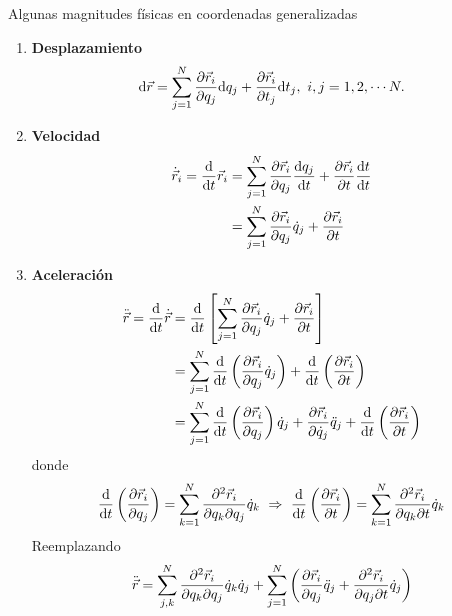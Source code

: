 \documentclass[../main]{subfiles}
\begin{document}
Algunas magnitudes físicas en coordenadas generalizadas
\begin{enumerate}
    \item \textbf{Desplazamiento}
    \begin{equation}
        \mathrm{d}\vec{r}=\sum_{j=1}^N \pdv{\vec{r}_i}{q_j}\mathrm{d}q_j+\pdv{\vec{r}_i}{t_j}\mathrm{d}t_j,\ i,j=1,2, \cdots N.
    \end{equation}
    \item \textbf{Velocidad}
    \begin{equation}
        \begin{split}
            \dot{\vec{r}}_i=\dv{}{t}\vec{r}_i&=\sum_{j=1}^N \pdv{\vec{r}_i}{q_j} \dv{q_j}{t}+\pdv{\vec{r}_i}{t}\dv{t}{t}\\
            &=\sum_{j=1}^N \pdv{\vec{r}_i}{q_j}\dot{q}_j+\pdv{\vec{r}_i}{t}
        \end{split}
    \end{equation}
    \item \textbf{Aceleración}
    \begin{equation}
        \begin{split}
            \ddot{\vec{r}}=\dv{}{t}\dot{\vec{r}}&=\dv{}{t}\left[\sum_{j=1}^N \pdv{\vec{r}_i}{q_j}\dot{q}_j+\pdv{\vec{r}_i}{t}\right]\\
            &=\sum_{j=1}^N \dv{}{t}\left(\pdv{\vec{r}_i}{q_j}\dot{q}_j\right)+\dv{}{t}\left(\pdv{\vec{r}_i}{t}\right)\\
            &=\sum_{j=1}^N \dv{}{t}\left(\pdv{\vec{r}_i}{q_j}\right)\dot{q}_j+\pdv{\vec{r}_i}{\dot{q}_j}\ddot{q}_j+\dv{}{t}\left(\pdv{\vec{r}_i}{t}\right)
        \end{split}
    \end{equation}
    donde
    \begin{equation}
        \dv{}{t}\left(\pdv{\vec{r}_i}{q_j}\right)=\sum_{k=1}^N \pdv{^2 \vec{r}_i}{q_k \partial q_j}\dot{q}_k \ \Rightarrow \ \dv{}{t}\left(\pdv{\vec{r}_i}{t}\right)=\sum_{k=1}^N \pdv{^2 \vec{r}_i}{q_k \partial t}\dot{q}_k
    \end{equation}
    Reemplazando
    \begin{equation}
        \ddot{\vec{r}}=\sum_{j,k}^N \pdv{^2 \vec{r}_i}{q_k \partial q_j} \dot{q}_k \dot{q}_j+\sum_{j=1}^N \left(\pdv{\vec{r}_i}{q_j}\ddot{q}_j+\pdv{^2 \vec{r}_i}{q_j \partial t}\dot{q}_j\right)
    \end{equation}
\end{enumerate}
\end{document}
